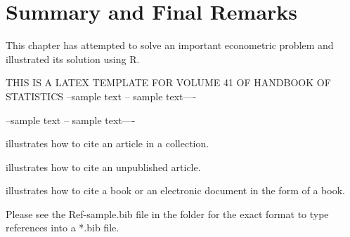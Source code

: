 \documentclass[12pt]{article}\usepackage[]{graphicx}\usepackage[]{color}
\begin{document}
\section{Summary and Final Remarks}
This chapter has attempted to solve an important econometric
problem and illustrated its solution using R.


THIS IS A LATEX TEMPLATE FOR VOLUME 41 OF HANDBOOK OF STATISTICS
--sample text -- sample text----

--sample text -- sample text----

\cite{Vinodb93} illustrates how to cite an article in a collection.

\cite{Vinodu07} illustrates how to cite an unpublished article.

\cite{R18} illustrates how to cite a book or an electronic document
in the form of a book.

Please see the Ref-sample.bib file in the folder for the exact format to type
references into a *.bib file.	





\end{document}
